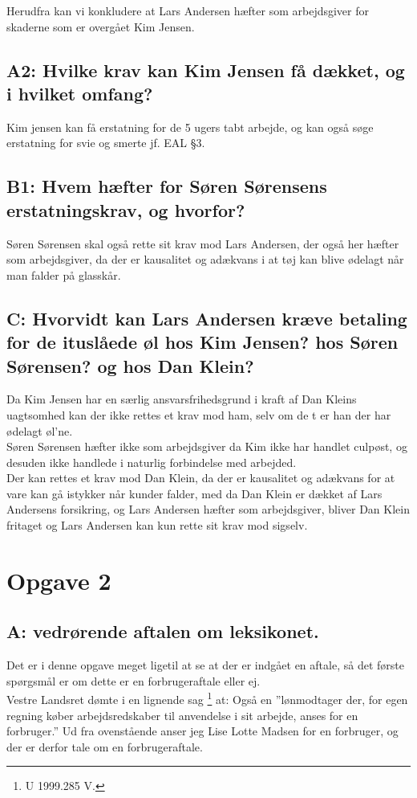 \documentclass[11pt, a4paper]{article}
\begin{document}
Herudfra kan vi konkludere at Lars Andersen hæfter som arbejdsgiver for skaderne
som er overgået Kim Jensen. 

\subsection*{A2: Hvilke krav kan Kim Jensen få dækket, og i hvilket omfang?}
Kim jensen kan få erstatning for de 5 ugers tabt arbejde, og kan også søge
erstatning for svie og smerte jf. EAL §3.

\subsection*{B1: Hvem hæfter for Søren Sørensens erstatningskrav, og hvorfor?}
Søren Sørensen skal også rette sit krav mod Lars Andersen, der også her hæfter
som arbejdsgiver, da der er kausalitet og adækvans i at tøj kan blive ødelagt
når man falder på glasskår. 

\subsection*{C: Hvorvidt kan Lars Andersen kræve betaling for de ituslåede øl
hos Kim Jensen? hos Søren Sørensen? og hos Dan Klein?}
Da Kim Jensen har en særlig ansvarsfrihedsgrund i kraft af Dan Kleins uagtsomhed
kan der ikke rettes et krav mod ham, selv om de t er han der har ødelagt
øl'ne.\\
Søren Sørensen hæfter ikke som arbejdsgiver da Kim ikke har handlet culpøst, og
desuden ikke handlede i naturlig forbindelse med arbejded.\\
Der kan rettes et krav mod Dan Klein, da der er kausalitet og adækvans for at
vare kan gå istykker når kunder falder, med da Dan Klein er dækket af Lars
Andersens forsikring, og Lars Andersen hæfter som arbejdsgiver, bliver Dan Klein
fritaget og Lars Andersen kan kun rette sit krav mod sigselv.

\section{Opgave 2}
\subsection*{A: vedrørende aftalen om leksikonet.}
Det er i denne opgave meget ligetil at se at der er indgået en aftale, så det
første spørgsmål er om dette er en forbrugeraftale eller ej.\\
Vestre Landsret dømte i en lignende sag \footnote{U 1999.285 V.} at: Også en
”lønmodtager der, for egen regning køber arbejdsredskaber til anvendelse i sit
arbejde, anses for en forbruger.”\cite[p.~141]{erhvervsjura}
Ud fra ovenstående anser jeg Lise Lotte Madsen for en forbruger, og der er
derfor tale om en forbrugeraftale.
\end{document}
